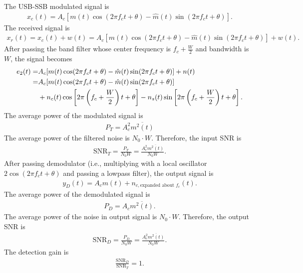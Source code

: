 \documentclass{assignment}
\begin{document}
\begin{sol}
    The USB-SSB modulated signal is
    \begin{align}
        x_c(t)=A_c[m(t)\cos(2\pi f_ct+\theta)-\hat{m}(t)\sin(2\pi f_ct+\theta)].
    \end{align}
    The received signal is
    \begin{align}
        x_r(t)=x_c(t)+w(t)=A_c[m(t)\cos(2\pi f_ct+\theta)-\hat{m}(t)\sin(2\pi f_ct+\theta)]+w(t).
    \end{align}
    After passing the band filter whose center frequency is $f_c+\frac{W}{2}$ and bandwidth is $W$, the signal becomes
    \begin{align}
        \notag e_2(t)=&A_c[m(t)\cos(2\pi f_ct+\theta)-\hat{m}(t)\sin(2\pi f_ct+\theta)]+n(t)\\
        \notag=&A_c[m(t)\cos(2\pi f_ct+\theta)-\hat{m}(t)\sin(2\pi f_ct+\theta)]\\
        &+n_c(t)\cos\left[2\pi\left(f_c+\frac{W}{2}\right)t+\theta\right]-n_s(t)\sin\left[2\pi\left(f_c+\frac{W}{2}\right)t+\theta\right].
    \end{align}
    The average power of the modulated signal is
    \begin{align}
        P_T=A_c^2\overline{m^2(t)}
    \end{align}
    The average power of the filtered noise is $N_0\cdot W$.
    Therefore, the input SNR is
    \begin{align}
        \text{SNR}_T=\frac{P_T}{N_0W}=\frac{A_c^2\overline{m^2(t)}}{N_0W}.
    \end{align}
    After passing demodulator (i.e., multiplying with a local oscillator $2\cos(2\pi f_ct+\theta)$ and passing a lowpass filter), the output signal is
    \begin{align}
        y_D(t)=A_cm(t)+n_{c,\text{expanded about }f_c}(t).
    \end{align}
    The average power of the demodulated signal is
    \begin{align}
        P_D=A_c\overline{m^2(t)}.
    \end{align}
    The average power of the noise in output signal is $N_0\cdot W$.
    Therefore, the output SNR is
    \begin{align}
        \text{SNR}_D=\frac{P_D}{N_0W}=\frac{A_c^2\overline{m^2(t)}}{N_0W}.
    \end{align}
    The detection gain is
    \begin{align}
        \frac{\text{SNR}_D}{\text{SNR}_T}=1.
    \end{align}

\end{sol}
\end{document}
